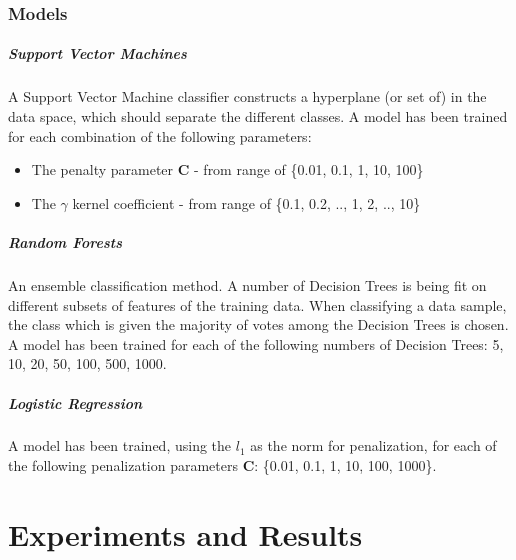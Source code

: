 \documentclass{article}
\begin{document}
\subsubsection{Models}

\subparagraph{Support Vector Machines}
A Support Vector Machine classifier constructs a hyperplane (or set of) in the data space, which should separate the different classes. A model has been trained for each combination of the following parameters:
\begin{itemize}
	\item The penalty parameter \textbf{C} - from range of \{0.01, 0.1, 1, 10, 100\}
	\item The $\gamma$ kernel coefficient - from range of \{0.1, 0.2, .., 1, 2, .., 10\}
\end{itemize}

\subparagraph{Random Forests}
An ensemble classification method. A number of Decision Trees is being fit on different subsets of features of the training data. When classifying a data sample, the class which is given the majority of votes among the Decision Trees is chosen. A model has been trained for each of the following numbers of Decision Trees: 5, 10, 20, 50, 100, 500, 1000.

\subparagraph{Logistic Regression}
A model has been trained, using the $l_1$ as the norm for penalization, for each of the following penalization parameters \textbf{C}: \{0.01, 0.1, 1, 10, 100, 1000\}.

\section{Experiments and Results}
\end{document}
